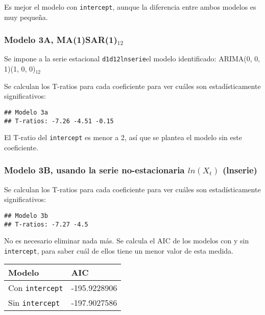 \documentclass[
]{article}
\begin{document}
Es mejor el modelo con \texttt{intercept}, aunque la diferencia entre
ambos modelos es muy pequeña.

\medskip

\hypertarget{modelo-3a-ma1sar1_12}{%
\subsubsection{\texorpdfstring{Modelo 3A,
MA(1)SAR(1)\(_{12}\)}{Modelo 3A, MA(1)SAR(1)\_\{12\}}}\label{modelo-3a-ma1sar1_12}}

Se impone a la serie estacional \texttt{d1d12lnserie}el modelo
identificado: ARIMA(0, 0, 1)(1, 0, 0)\(_{12}\)

Se calculan los T-ratios para cada coeficiente para ver cuáles son
estadísticamente significativos:

\begin{verbatim}
## Modelo 3a 
## T-ratios: -7.26 -4.51 -0.15
\end{verbatim}

El T-ratio del \texttt{intercept} es menor a 2, así que se plantea el
modelo sin este coeficiente.

\medskip

\hypertarget{modelo-3b-usando-la-serie-no-estacionaria-lnx_t-lnserie}{%
\subsubsection{\texorpdfstring{Modelo 3B, usando la serie
no-estacionaria \(ln(X_t)\)
(lnserie)}{Modelo 3B, usando la serie no-estacionaria ln(X\_t) (lnserie)}}\label{modelo-3b-usando-la-serie-no-estacionaria-lnx_t-lnserie}}

Se calculan los T-ratios para cada coeficiente para ver cuáles son
estadísticamente significativos:

\begin{verbatim}
## Modelo 3b 
## T-ratios: -7.27 -4.5
\end{verbatim}

No es necesario eliminar nada más. Se calcula el AIC de los modelos con
y sin \texttt{intercept}, para saber cuál de ellos tiene un menor valor
de esta medida.

\begin{longtable}[]{@{}ll@{}}
\toprule()
Modelo & AIC \\
\midrule()
\endhead
Con \texttt{intercept} & -195.9228906 \\
Sin \texttt{intercept} & -197.9027586 \\
\bottomrule()
\end{longtable}
\end{document}
